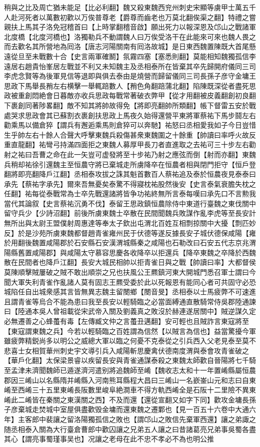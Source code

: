 稍與之比及周亡猶未能足【比必利翻】魏又殺東魏西兖州刺史宋顯等虜甲士萬五千人赴河死者以萬數初歡以万俟普尊老【爵尊而齒老也万莫北翻俟渠之翻】特禮之嘗親扶上馬其子洛免冠稽首曰【上時掌翻稽音啟】願出死力以報深恩及邙山之戰諸軍北度橋【北度河橋也】洛獨勒兵不動謂魏人曰万俟受洛干在此能來可來也魏人畏之而去歡名其所營地為囘洛【唐志河陽關南有囘洛故城】是日東西魏置陳既大首尾懸遠從旦至未戰數十合【史言兩軍確鬭】氛霧四塞【塞悉則翻】莫能相知魏獨孤信李遠居右趙貴怡峯居左戰並不利又未知魏主及丞相泰所在皆棄其卒先歸開府儀同三司李虎念賢等為後軍見信等退即與俱去泰由是燒營而歸留儀同三司長孫子彦守金墉王思政下馬舉長矟左右横擊一舉輒踣數人【矟色角翻踣蒲北翻】陷陳既深從者盡死思政被重創悶絶會日暮敵亦收兵思政每戰常著破衣弊甲【從才用翻被皮義翻創初良翻下裹創同著陟畧翻】敵不知其將帥故得免【將即亮翻帥所類翻】帳下督雷五安於戰處哭求思政會其已蘇割衣裹創扶思政上馬夜久始得還營平東將軍蔡祐下馬步鬪左右勸乘馬以備倉猝【謂兵有邂逅乘馬則倉猝可以奔馳】祐怒曰丞相愛我如子今日豈惜生乎帥左右十餘人合聲大呼擊東魏兵殺傷甚衆東魏圍之十餘重【帥讀曰率呼火故反重直龍翻】祐彎弓持滿四面拒之東魏人募厚甲長刀者直進取之去祐可三十步左右勸射之祐曰吾曹之命在此一矢豈可虚發將至十步祐乃射之應弦而倒【射而亦翻】東魏兵稍却祐徐引還魏主至恒農守將已棄城走所虜降卒在恒農者相與閉門拒守【恒戶登翻將即亮翻降戶江翻】丞相泰攻拔之誅其魁首數百人蔡祐追及泰於恒農夜見泰泰曰承先【蔡祐字承先】爾來吾無憂矣泰驚不得寢枕祐股然後安【史言泰氣衰膽失枕之任翻】祐每從泰戰常為士卒先戰還諸將皆争功祐終無所言泰每嘆曰承先口不言勲我當代其論叙【史言蔡祐沉勇不伐】泰留王思政鎮恒農除侍中東道行臺魏之東伐關中留守兵少【少詩沼翻】前後所虜東魏士卒散在民間聞魏兵敗謀作亂李虎等至長安計無所出與太尉王盟僕射周惠達等奉太子欽出屯渭北百姓互相剽掠關中大擾【剽匹妙反】於是沙苑所虜東魏都督趙青雀雍州民于伏德等遂反據長安子城伏德保咸陽【雍於用翻後魏置咸陽郡於石安縣石安漢渭城縣秦之咸陽也石勒改曰石安五代志京兆渭陽縣舊置咸陽郡】與咸陽太守慕容思慶各收降卒以拒還兵【降卒東魏之卒降於西魏散在民間者也降戶江翻】長安大城民相帥以拒青雀日與之戰【帥讀曰率】大都督侯莫陳順擊賊屢破之賊不敢出順崇之兄也扶風公王羆鎮河東大開城門悉召軍士謂曰今聞大軍失利青雀作亂諸人莫有固志王羆受委於此以死報恩有能同心者可共固守必恐城陷任自出城衆感其言皆無異志魏主留閿鄉【閿音旻】丞相泰以士馬疲弊不可速進且謂青雀等烏合不能為患曰我至長安以輕騎臨之必當面縛通直散騎常侍吳郡陸通諫曰【陸通本吳人曾祖載從宋武帝入關及劉義真之敗沒於赫連遂居關中】賊逆謀久定必無遷善之心蜂蠆有毒【左傳臧文仲之言蠆丑邁翻】安可輕也且賊詐言東寇將至【東寇謂東魏之兵】今若以輕騎臨之百姓謂為信然【以賊言為信也】益當驚擾今軍雖疲弊精鋭尚多以明公之威總大軍以臨之何憂不克泰從之引兵西入父老見泰至莫不悲喜士女相賀華州刺史宇文導引兵入咸陽斬思慶禽伏德南度渭與泰會攻青雀破之【華戶化翻】太保梁景睿以疾留長安與青雀通謀泰殺之東魏太師歡自晉陽將七千騎至孟津未濟聞魏師已遁遂濟河遣别將追魏師至崤【魏收志太和十一年置崤縣屬恒農郡因三崤山以名縣隋并崤縣入河南熊耳縣程大昌曰三崤山一名嶔崟山元和志曰自東崤至西崤三十五里東崤長阪數里峻阜絶澗車不得方軌西崤全是石阪十二里險不異東崤此二崤皆在秦關之東漢關之西】不及而還【還從宣翻又如字下同】歡攻金墉長孫子彦棄城走焚城中室屋俱盡歡毁金墉而還東魏之遷鄴也【見一百五十六卷中大通六年】主客郎中裴讓之留洛陽獨孤信之敗也【謂邙山之敗信先棄軍西還】讓之弟諏之随丞相泰入關為大行臺倉曹郎中歡囚讓之兄弟五人讓之曰昔諸葛亮兄弟事吳蜀各盡其心【謂亮事蜀瑾事吴也】况讓之老母在此不忠不孝必不為也明公推